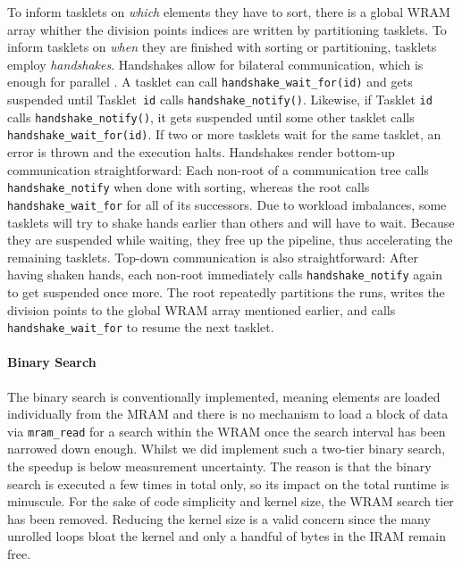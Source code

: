 To inform tasklets on \emph{which} elements they have to sort, there is a global \ac{WRAM} array whither the division points indices are written by partitioning tasklets.
To inform tasklets on \emph{when} they are finished with sorting or partitioning, tasklets employ \emph{handshakes}.
Handshakes allow for bilateral communication, which is enough for parallel \MS{}.
A tasklet can call \lstinline|handshake_wait_for(id)| and gets suspended until Tasklet~\lstinline|id| calls \lstinline|handshake_notify()|.
Likewise, if Tasklet \lstinline|id| calls \lstinline|handshake_notify()|, it gets suspended until some other tasklet calls \lstinline|handshake_wait_for(id)|.
If two or more tasklets wait for the same tasklet, an error is thrown and the execution halts.
Handshakes render bottom-up communication straightforward:
Each non-root of a communication tree calls \lstinline|handshake_notify| when done with sorting, whereas the root calls \lstinline|handshake_wait_for| for all of its successors.
Due to workload imbalances, some tasklets will try to shake hands earlier than others and will have to wait.
Because they are suspended while waiting, they free up the pipeline, thus accelerating the remaining tasklets.
Top-down communication is also straightforward:
After having shaken hands, each non-root immediately calls \lstinline|handshake_notify| again to get suspended once more.
The root repeatedly partitions the runs, writes the division points to the global \ac{WRAM} array mentioned earlier, and calls \lstinline|handshake_wait_for| to resume the next tasklet.


\paragraph{Binary Search}
The binary search is conventionally implemented, meaning elements are loaded individually from the \ac{MRAM} and there is no mechanism to load a block of data via \lstinline|mram_read| for a search within the \ac{WRAM} once the search interval has been narrowed down enough.
Whilst we did implement such a two-tier binary search, the speedup is below measurement uncertainty.
The reason is that the binary search is executed a few times in total only, so its impact on the total runtime is minuscule.
For the sake of code simplicity and kernel size, the \ac{WRAM} search tier has been removed.
Reducing the kernel size is a valid concern since the many unrolled loops bloat the kernel and only a handful of bytes in the \ac{IRAM} remain free.


